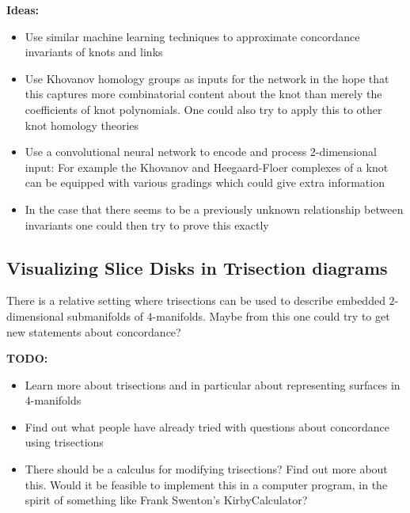 \noindent \textbf{Ideas:}
\begin{itemize}
	\item Use similar machine learning techniques to approximate
	concordance invariants of knots and links
	
	\item Use Khovanov homology groups as inputs for the
	network in the hope that this captures more combinatorial content
	about the knot than merely the coefficients of knot polynomials.
	One could also try to apply this to other knot homology theories
	
	\item Use a convolutional neural network to encode and process $2$-dimensional input:
	For example the Khovanov and Heegaard-Floer complexes of a knot can be equipped
	with various gradings which could give extra information
	
	\item In the case that there seems to be a previously unknown relationship
	between invariants one could then try to prove this exactly 
\end{itemize}



\subsection{Visualizing Slice Disks in Trisection diagrams}

There is a relative setting where trisections can be used to
describe embedded $2$-dimensional submanifolds of
$4$-manifolds.
Maybe from this one could try to get new statements about
concordance?


\noindent \textbf{TODO:}
\begin{itemize}
	\item Learn more about trisections and in particular about
	representing surfaces in $4$-manifolds
	
	\item Find out what people have already tried with questions
	about concordance using trisections
	
	\item There should be a calculus for modifying trisections?
	Find out more about this.
	Would it be feasible to implement this in a computer program,
	in the spirit of something like Frank Swenton's KirbyCalculator?
	\citep{kirbycalculator}
	
\end{itemize}

